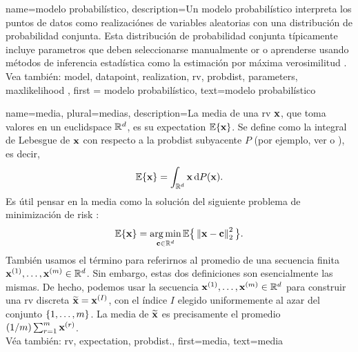 {
	name=modelo probabilístico,
	description={Un modelo probabilístico interpreta los puntos de datos
		como realizaciónes de variables aleatorias con una distribución de probabilidad conjunta. Esta distribución de probabilidad conjunta típicamente 
		incluye parametros que deben seleccionarse manualmente or o aprenderse usando métodos de inferencia estadística  
		como la estimación por máxima verosimilitud \cite{LC}.
		\\
		Vea también: \gls{model}, \gls{datapoint}, \gls{realization}, \gls{rv}, \gls{probdist}, \gls{parameters}, \gls{maxlikelihood} }, 
	first = {modelo probabilístico}, text={modelo probabilístico} 
}



		{name={media},
			plural={medias},
			description={La media de una \gls{rv} ${\bf x}$, que toma
				valores en un \gls{euclidspace} $\mathbb{R}^{d}$, es su
				\gls{expectation} $\mathbb{E}\{{\bf x}\}$. Se define como la integral de Lebesgue
				de ${\bf x}$ con respecto a la \gls{probdist} subyacente $P$ (por ejemplo,
				ver \cite{RudinBookPrinciplesMatheAnalysis} o \cite{BillingsleyProbMeasure}), es decir,
				\[
					\mathbb{E}\{{\bf x}\} = \int_{\mathbb{R}^{d}} {\bf x} \, \mathrm{d}P({\bf x}).
				\]
				Es útil pensar en la media como la solución del siguiente problema de minimización de \gls{risk}
				\cite{BertsekasProb}:
				\[
					\mathbb{E}\{{\bf x}\} = \operatorname*{arg\,min}_{{\bf c} \in \mathbb{R}^{d}}
					\mathbb{E} \big\{\left\Vert {{\bf x}- {\bf c}} \right\Vert_{2}^{2}\big \}.
				\]
				También usamos el término para referirnos al promedio de una secuencia finita
				${\bf x}^{(1)}, \ldots, {\bf x}^{(m)} \in \mathbb{R}^{d}$. Sin embargo,
				estas dos definiciones son esencialmente las mismas. De hecho, podemos usar la secuencia
				${\bf x}^{(1)}, \ldots, {\bf x}^{(m)} \in \mathbb{R}^{d}$ para construir una
				\gls{rv} discreta $\widetilde{{\bf x}}={\bf x}^{(I)}$, con el índice $I$ elegido uniformemente
				al azar del conjunto $\{1, \ldots, m\}$. La media de $\widetilde{{\bf x}}$ es
				precisamente el promedio $({1}/{m}) \sum_{r=1}^{m} {\bf x}^{(r)}$.
				\\
				Véa también: \gls{rv}, \gls{expectation}, \gls{probdist}.},
			first={media},
			text={media}
		}

